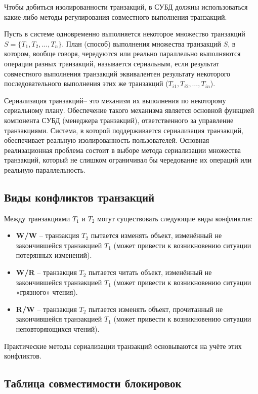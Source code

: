 \documentclass[a4paper,12pt]{article}
\begin{document}
Чтобы добиться изолированности транзакций, в СУБД должны использоваться какие-либо методы регулирования совместного выполнения транзакций.

Пусть в системе одновременно выполняется некоторое множество транзакций $S = \{T_1, T_2, \ldots, T_n\}$. План (способ) выполнения множества транзакций $S$, в котором, вообще говоря, чередуются или реально параллельно выполняются операции разных транзакций, называется сериальным, если результат совместного выполнения транзакций эквивалентен результату некоторого последовательного выполнения этих же транзакций ($T_{i1}, T_{i2}, \ldots, T_{in}$).

Сериализация транзакций– это механизм их выполнения по некоторому сериальному плану. Обеспечение такого механизма является основной функцией компонента СУБД (менеджера транзакций), ответственного за управление транзакциями. Система, в которой поддерживается сериализация транзакций, обеспечивает реальную изолированность пользователей. Основная реализационная проблема состоит в выборе метода сериализации множества транзакций, который не слишком ограничивал бы чередование их операций или реальную параллельность.

\subsection{Виды конфликтов транзакций}

Между транзакциями $T_1$ и $T_2$ могут существовать следующие виды конфликтов:
\begin{itemize}
    \item \textbf{W/W} – транзакция $T_2$ пытается изменять объект, изменённый не закончившейся транзакцией $T_1$ (может привести к возникновению ситуации потерянных изменений).
    \item \textbf{W/R} – транзакция $T_2$ пытается читать объект, изменённый не закончившейся транзакцией $T_1$ (может привести к возникновению ситуации «грязного» чтения).
    \item \textbf{R/W} – транзакция $T_2$ пытается изменять объект, прочитанный не закончившейся транзакцией $T_1$ (может привести к возникновению ситуации неповторяющихся чтений).
\end{itemize}

Практические методы сериализации транзакций основываются на учёте этих конфликтов.

\subsection{Таблица совместимости блокировок}
\end{document}
